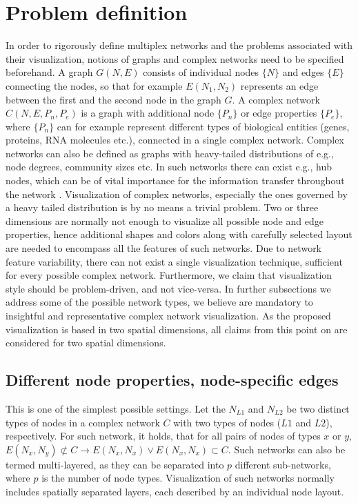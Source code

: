 \section{Problem definition}
In order to rigorously define multiplex networks and the problems associated with their visualization, notions of graphs and complex networks need to be specified beforehand. A graph $G(N,E)$ consists of individual nodes $\{N\}$ and edges $\{E\}$ connecting the nodes, so that for example $E(N_{1},N_{2})$ represents an edge between the first and the second node in the graph $G$. A complex network $C(N,E,P_{n},P_{e})$ is a graph with additional node $\{P_{n}\}$ or edge properties $\{P_{e}\}$, where $\{P_{n}\}$ can for example represent different types of biological entities (genes, proteins, RNA molecules etc.), connected in a single complex network. Complex networks can also be defined as graphs with heavy-tailed distributions of e.g., node degrees, community sizes etc. In such networks there can exist e.g., hub nodes, which can be of vital importance for the information transfer throughout the network \cite{foss2011introduction}. Visualization of complex networks, especially the ones governed by a heavy tailed distribution is by no means a trivial problem. Two or three dimensions are normally not enough to visualize all possible node and edge properties, hence additional shapes and colors along with carefully selected layout are needed to encompass all the features of such networks. Due to network feature variability, there can not exist a single visualization technique, sufficient for every possible complex network. Furthermore, we claim that visualization style should be problem-driven, and not vice-versa. In further subsections we address some of the possible network types, we believe are mandatory to insightful and representative complex network visualization. As the proposed visualization is based in two spatial dimensions, all claims from this point on are considered for two spatial dimensions.

\subsection{Different node properties, node-specific edges}
\label{dnpnse}
This is one of the simplest possible settings. Let the $N_{L1}$ and $N_{L2}$ be two distinct types of nodes in a complex network $C$ with two types of nodes ($L1$ and $L2$), respectively. For such network, it holds, that for all pairs of nodes of types $x$ or $y$, $E(N_{x},N_{y}) \not\subset C \rightarrow E(N_{x},N_{x}) \vee E(N_{x},N_{x}) \subset C$. Such networks can also be termed multi-layered, as they can be separated into $p$ different sub-networks, where $p$ is the number of node types. Visualization of such networks normally includes spatially separated layers, each described by an individual node layout.

